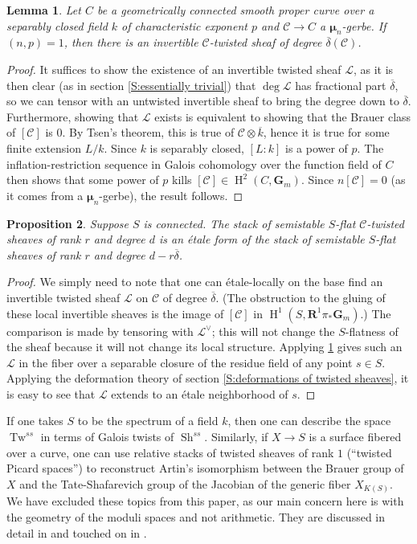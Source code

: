 \documentclass[11pt]{amsart}
\newcommand{\field}[1]{\mathbf #1}
\newcommand{\ms}[1]{\mathscr #1}
\newcommand{\widebar}[1]{\overline{#1}}
\newcommand{\R}{\field R}
\newcommand{\m}{\boldsymbol{\mu}}
\newcommand{\G}{\field G} %
\renewcommand{\H}{\operatorname{H}}
\renewcommand{\[}{[\!\hspace{0.03em}[}
\renewcommand{\]}{]\!\hspace{0.03em}]}
\renewcommand{\(}{(\!\hspace{0.03em}(}
\renewcommand{\)}{)\!\hspace{0.03em})}
\DeclareMathOperator*{\tensor}{\otimes}
\DeclareMathOperator{\mTw}{Tw}
\DeclareMathOperator{\mSh}{Sh}
\newtheorem{lem}{Lemma}[subsubsection]%
\newtheorem{prop}[lem]{Proposition}
\theoremstyle{definition}
\theoremstyle{remark}
\begin{document}
\begin{lem}\label{L:line bundle exists} Let $C$ be a geometrically connected smooth proper curve over a separably closed field $k$ of characteristic exponent $p$ and $\ms C\to C$ a $\m_n$-gerbe.  If $(n,p)=1$, then there is an invertible $\ms C$-twisted sheaf of degree $\widebar{\delta}(\ms C)$.
\end{lem}
\begin{proof} It suffices to show the existence of an invertible twisted sheaf $\ms L$, as it is then clear (as in section \ref{S:essentially trivial}) that $\deg\ms L$ has fractional part $\widebar{\delta}$, so we can tensor with an untwisted invertible sheaf to bring the degree down to $\widebar{\delta}$.  Furthermore, showing that $\ms L$ exists is equivalent to showing that the Brauer class of $[\ms C]$ is $0$.   By Tsen's theorem, this is true of $\ms C\tensor\widebar k$, hence it is true for some finite extension $L/k$.  Since $k$ is separably closed, $[L:k]$ is a power of $p$.  The inflation-restriction sequence in Galois cohomology over the function field of $C$ then shows that some power of $p$ kills $[\ms C]\in\H^2(C,\G_m)$.  Since $n[\ms C]=0$ (as it comes from a $\m_n$-gerbe), the result follows.
\end{proof}

\begin{prop}\label{P:twisted is form} Suppose $S$ is connected.  The stack of semistable $S$-flat $\ms C$-twisted sheaves 
of rank $r$ and degree $d$ is an \'etale form of the stack of 
semistable $S$-flat sheaves of rank $r$ and degree 
$d-r\widebar{\delta}$.
\end{prop}
\begin{proof} We simply need to note that one can \'etale-locally on 
the base find an invertible twisted sheaf $\ms L$ on $\ms C$ of degree 
$\widebar{\delta}$.  (The obstruction to the gluing of these local 
invertible sheaves is the image of $[\ms C]$ in 
$\H^{1}(S,\R^{1}\pi_{\ast}\G_{m})$.)  The comparison is made by tensoring with $\ms L^{\vee}$; this 
will not change the $S$-flatness of the sheaf because it will not 
change its local structure.  Applying \ref{L:line bundle exists} gives such an $\ms L$ in the fiber over a separable closure of the residue field of any point $s\in S$.  Applying the deformation theory of section \ref{S:deformations of twisted sheaves}, it is easy to see that $\ms L$ extends to an \'etale neighborhood of $s$.
\end{proof}

If one takes $S$ to be the spectrum of a field $k$, then one can 
describe the space $\mTw^{ss}$ in terms of Galois twists of 
$\mSh^{ss}$.  Similarly, if $X\to S$ is a surface fibered 
over a curve, 
one can use relative stacks of twisted sheaves of 
rank $1$ (``twisted Picard spaces'') to reconstruct Artin's 
isomorphism between the Brauer group of $X$ and the 
Tate-Shafarevich group of the Jacobian of the generic fiber $X_{K(S)}$.  We have excluded 
these topics from this paper, as our main concern here is with the 
geometry of the moduli spaces and not arithmetic.
They are discussed in detail in \cite{mythesis} and touched on in 
\cite{period-index-paper}.  
\end{document}
